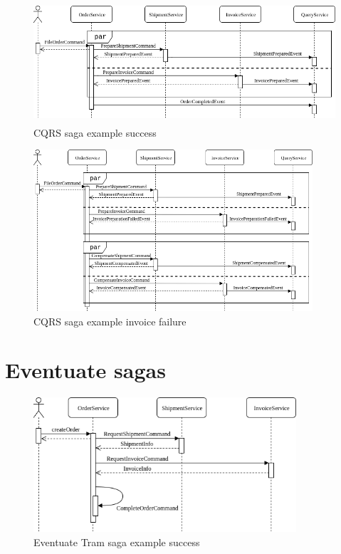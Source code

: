 \documentclass[oneside,
  digital, %
  table,   %
  nolof,     %
  nolot,     %
]{fithesis3}
\begin{document}
\begin{figure}[h]
    \begin{center}
        \includegraphics[height=45mm]{images/sequence/validSagaCQRS.png}
    \end{center}
    \caption{CQRS saga example success}
\end{figure}

\hfill \break

\begin{figure}[h]
    \begin{center}
        \includegraphics[height=60mm]{images/sequence/invoiceFailSagaCQRS.png}
    \end{center}
    \caption{CQRS saga example invoice failure}
\end{figure}

\section{Eventuate sagas}

\begin{figure}[h]
    \begin{center}
        \includegraphics[height=50mm]{images/sequence/validSagaTram.png}
    \end{center}
    \caption{Eventuate Tram saga example success}
\end{figure}
\end{document}
